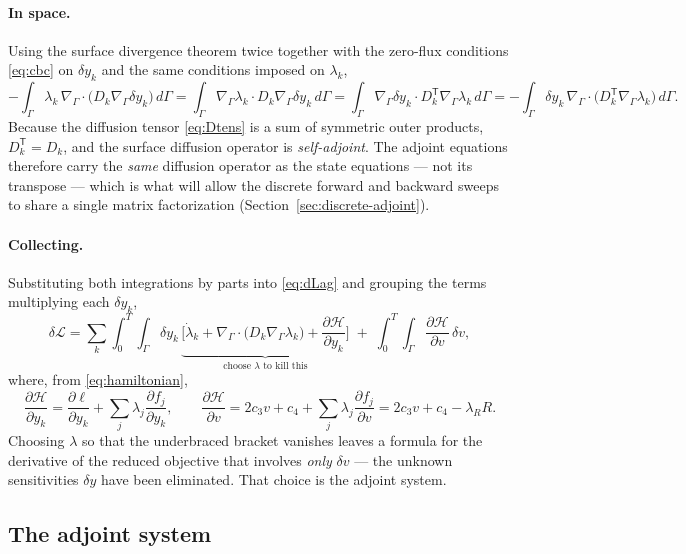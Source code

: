 \documentclass[11pt]{article}
\newcommand{\Grad}{\nabla_\Gamma}
\newcommand{\Div}{\nabla_\Gamma\cdot}
\newcommand{\Ham}{\mathcal{H}}
\newcommand{\Lag}{\mathcal{L}}
\begin{document}
\paragraph{In space.} Using the surface divergence theorem twice together with the zero-flux conditions \eqref{eq:cbc} on $\delta y_k$ and the same conditions imposed on $\lambda_k$,
\[
-\int_\Gamma \lambda_k\,\Div\big(D_k\Grad\delta y_k\big)\,d\Gamma
= \int_\Gamma \Grad\lambda_k\cdot D_k\Grad\delta y_k \,d\Gamma
= \int_\Gamma \Grad \delta y_k\cdot D_k^{\mathsf T}\Grad\lambda_k \,d\Gamma
= -\int_\Gamma \delta y_k\,\Div\big(D_k^{\mathsf T}\Grad\lambda_k\big)\,d\Gamma.
\]
Because the diffusion tensor \eqref{eq:Dtens} is a sum of symmetric outer products, $D_k^{\mathsf T}=D_k$, and the surface diffusion operator is \emph{self-adjoint}. The adjoint equations therefore carry the \emph{same} diffusion operator as the state equations --- not its transpose --- which is what will allow the discrete forward and backward sweeps to share a single matrix factorization (Section~\ref{sec:discrete-adjoint}).

\paragraph{Collecting.} Substituting both integrations by parts into \eqref{eq:dLag} and grouping the terms multiplying each $\delta y_k$,
\begin{equation}
\delta\Lag = \sum_k\int_0^T\!\!\int_\Gamma \delta y_k\,
\underbrace{\Big[\dot\lambda_k + \Div\big(D_k\Grad\lambda_k\big) + \frac{\partial \Ham}{\partial y_k}\Big]}_{\text{choose }\lambda\text{ to kill this}}
\;+\;\int_0^T\!\!\int_\Gamma \frac{\partial\Ham}{\partial v}\,\delta v,
\label{eq:collected}
\end{equation}
where, from \eqref{eq:hamiltonian},
\[
\frac{\partial\Ham}{\partial y_k} = \frac{\partial \ell}{\partial y_k} + \sum_j \lambda_j\frac{\partial f_j}{\partial y_k},
\qquad
\frac{\partial\Ham}{\partial v} = 2c_3 v + c_4 + \sum_j \lambda_j\frac{\partial f_j}{\partial v} = 2c_3 v + c_4 - \lambda_R R .
\]
Choosing $\lambda$ so that the underbraced bracket vanishes leaves a formula for the derivative of the reduced objective that involves \emph{only} $\delta v$ --- the unknown sensitivities $\delta y$ have been eliminated. That choice is the adjoint system.

\subsection{The adjoint system}
\label{sec:adjoint-system}
\end{document}
